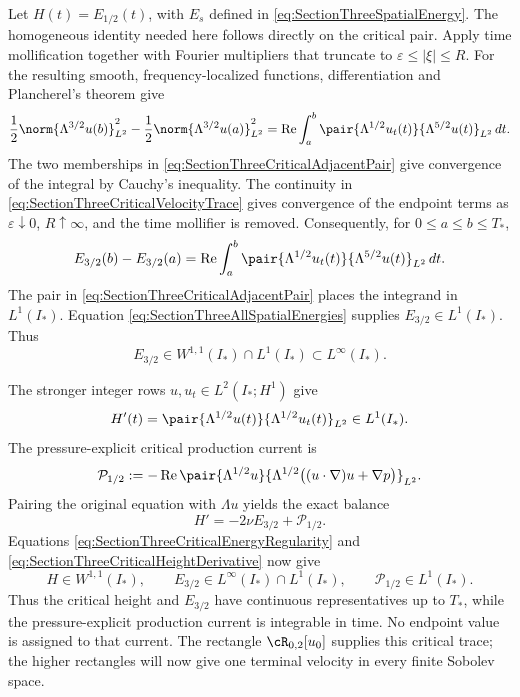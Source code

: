 Let \(H(t)=E_{1/2}(t)\), with \(E_s\) defined in \eqref{eq:SectionThreeSpatialEnergy}.
The homogeneous identity needed here follows directly on the critical pair.
Apply time mollification together with Fourier multipliers that truncate to
\(\varepsilon\leq|\xi|\leq R\).
For the resulting smooth, frequency-localized functions, differentiation and Plancherel's theorem give
\[
  \frac{1}{2}\norm{\Lambda^{3/2}u(b)}_{L^2}^{2}
  -\frac{1}{2}\norm{\Lambda^{3/2}u(a)}_{L^2}^{2}
  =
  \operatorname{Re}\int_a^b
  \pair{\Lambda^{1/2}u_t(t)}{\Lambda^{5/2}u(t)}_{L^2}
  \,dt.
\]
The two memberships in \eqref{eq:SectionThreeCriticalAdjacentPair} give convergence of the integral by Cauchy's inequality.
The continuity in \eqref{eq:SectionThreeCriticalVelocityTrace} gives convergence of the endpoint terms as \(\varepsilon\downarrow0\), \(R\uparrow\infty\), and the time mollifier is removed.
Consequently, for \(0\leq a\leq b\leq T_*\),
\[
  E_{3/2}(b)-E_{3/2}(a)
  =
  \operatorname{Re}\int_a^b
  \pair{\Lambda^{1/2}u_t(t)}{\Lambda^{5/2}u(t)}_{L^2}
  \,dt.
\]
The pair in \eqref{eq:SectionThreeCriticalAdjacentPair} places the integrand in \(L^1(I_*)\).
Equation \eqref{eq:SectionThreeAllSpatialEnergies} supplies \(E_{3/2}\in L^1(I_*)\).
Thus
\begin{equation}\label{eq:SectionThreeCriticalEnergyRegularity}
  E_{3/2}\in W^{1,1}(I_*)\cap L^1(I_*)
  \subset L^\infty(I_*).
\end{equation}

The stronger integer rows \(u,u_t\in L^2(I_*;H^1)\) give
\begin{equation}\label{eq:SectionThreeCriticalHeightDerivative}
  H'(t)
  =\pair{\Lambda^{1/2}u(t)}{\Lambda^{1/2}u_t(t)}_{L^2}
  \in L^1(I_*).
\end{equation}
The pressure-explicit critical production current is
\[
  \mathcal P_{1/2}
  :=
  -\operatorname{Re}
  \pair{\Lambda^{1/2}u}
  {\Lambda^{1/2}\bigl((u\cdot\nabla)u+\nabla p\bigr)}_{L^2}.
\]
Pairing the original equation with \(\Lambda u\) yields the exact balance
\[
  H'=-2\nu E_{3/2}+\mathcal P_{1/2}.
\]
Equations \eqref{eq:SectionThreeCriticalEnergyRegularity} and \eqref{eq:SectionThreeCriticalHeightDerivative} now give
\[
  H\in W^{1,1}(I_*),
  \qquad
  E_{3/2}\in L^\infty(I_*)\cap L^1(I_*),
  \qquad
  \mathcal P_{1/2}\in L^1(I_*).
\]
Thus the critical height and \(E_{3/2}\) have continuous representatives up to \(T_*\), while the pressure-explicit production current is integrable in time.
No endpoint value is assigned to that current.
The rectangle \(\cR_{0,2}[u_0]\) supplies this critical trace; the higher rectangles will now give one terminal velocity in every finite Sobolev space.
